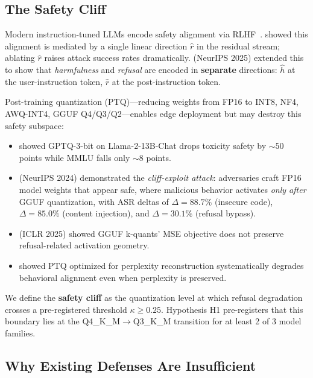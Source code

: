 \documentclass[11pt,a4paper]{article}
\newcommand{\kap}{\kappa}
\newcommand{\rhat}{\hat{r}}
\newcommand{\hhat}{\hat{h}}
\begin{document}
\subsection{The Safety Cliff}

Modern instruction-tuned LLMs encode safety alignment via RLHF~\citep{ouyang2022training,
bai2022training}.
\citet{arditi2024refusal} showed this alignment is mediated by a single linear
direction $\rhat$ in the residual stream; ablating $\rhat$ raises attack
success rates dramatically.
\citet{zhao2025refusal} (NeurIPS 2025) extended this to show that
\emph{harmfulness} and \emph{refusal} are encoded in \textbf{separate} directions:
$\hhat$ at the user-instruction token, $\rhat$ at the post-instruction token.

Post-training quantization (PTQ)---reducing weights from FP16 to INT8, NF4, AWQ-INT4,
GGUF Q4/Q3/Q2---enables edge deployment but may destroy this safety subspace:

\begin{itemize}[leftmargin=2em, itemsep=3pt]
  \item \citet{hong2024quant} showed GPTQ-3-bit on Llama-2-13B-Chat drops toxicity
        safety by ${\sim}50$ points while MMLU falls only ${\sim}8$ points.
  \item \citet{egashira2024exploiting} (NeurIPS 2024) demonstrated the
        \emph{cliff-exploit attack}: adversaries craft FP16 model weights that
        appear safe, where malicious behavior activates \emph{only after} GGUF
        quantization, with ASR deltas of $\Delta = 88.7\%$ (insecure code),
        $\Delta = 85.0\%$ (content injection), and $\Delta = 30.1\%$ (refusal bypass).
  \item \citet{mindthegap2025} (ICLR 2025) showed GGUF k-quants' MSE objective
        does not preserve refusal-related activation geometry.
  \item \citet{wee2025caq} showed PTQ optimized for perplexity reconstruction
        systematically degrades behavioral alignment even when perplexity is preserved.
\end{itemize}

We define the \textbf{safety cliff} as the quantization level at which
refusal degradation crosses a pre-registered threshold $\kap \ge 0.25$.
Hypothesis H1 pre-registers that this boundary lies at the Q4\_K\_M$\to$Q3\_K\_M
transition for at least 2 of 3 model families.

\subsection{Why Existing Defenses Are Insufficient}
\end{document}
